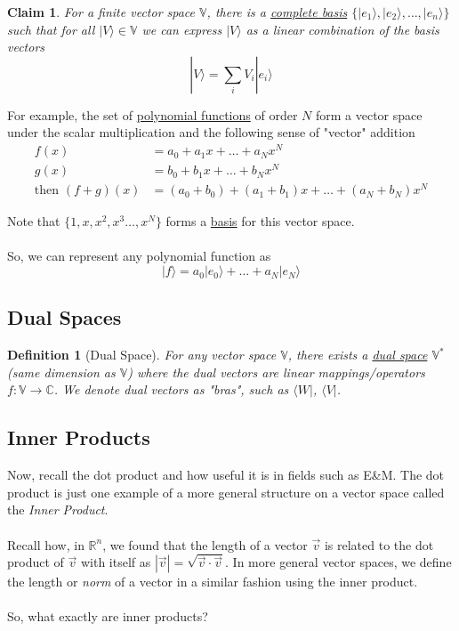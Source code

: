 \documentclass[twoside]{article}
\newcommand{\ket}[1]{|#1 \rangle}
\newcommand{\bra}[1]{\langle #1|}
\newcommand{\R}{\mathbb{R}}
\newcommand{\C}{\mathbb{C}}
\newcommand{\V}{\mathbb{V}}
\newtheorem{claim}[theorem]{Claim}
\newtheorem{definition}[theorem]{Definition}
\begin{document}
\begin{claim}
For a finite vector space $\V$, there is a \underline{complete basis} $\{ \ket{e_1},  \ket{e_2}, \dots,  \ket{e_n} \}$ such that for all $\ket{V} \in \V$ we can express $\ket{V}$ as a linear combination of the basis vectors
\[\ket{V} = \sum_i V_i \ket{e_i} \]
\end{claim}

For example, the set of \underline{polynomial functions} of order $N$ form a vector space under the scalar multiplication and the following sense of "vector" addition
\begin{align*}
	f(x) &= a_0 + a_1 x + \dots + a_N x^N \\
	g(x) &= b_0 + b_1 x + \dots + b_N x^N \\
\text{then } (f+g)(x) &= (a_0 + b_0) + (a_1 + b_1)x + \dots + (a_N + b_N)x^N
\end{align*}

Note that $\{ 1, x, x^2, x^3 \dots, x^N \}$ forms a \underline{basis} for this vector space.
\\
\\
So, we can represent any polynomial function as 
\[ \ket{f} = a_0 \ket{e_0} + \dots + a_N \ket{e_N} \] 

\subsection*{Dual Spaces}

\begin{definition}[Dual Space]
   For any vector space $\V$, there exists a \underline{dual space} $\V^*$ (same dimension as $\V$) where the dual vectors are linear mappings/operators $f : \V \rightarrow \C$. We denote dual vectors as "bras", such as $\bra{W}$, $\bra{V}$.
\end{definition}

\subsection*{Inner Products}

Now, recall the dot product and how useful it is in fields such as E\&M. The dot product is just one example of a more general structure on a vector space called the \emph{Inner Product}.
\\
\\
Recall how, in $\R^n$, we found that the length of a vector $\vec{v}$ is related to the dot product of $\vec{v}$ with itself as $|\vec{v}| = \sqrt{\vec{v} \cdot \vec{v}}$. In more general vector spaces, we define the length or \emph{norm} of a vector in a similar fashion using the inner product.
\\
\\
So, what exactly are inner products?
\end{document}
